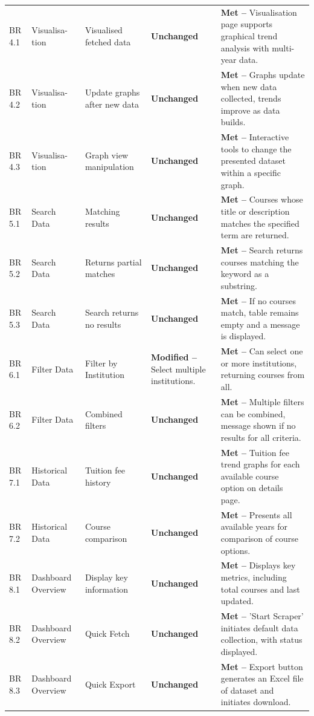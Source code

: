 \begin{xltabular}{\textwidth}{@{} l p{1.5cm} p{2.5cm} p{3.5cm} X @{}}
\midrule

BR 4.1 & Visualisa-tion & Visualised fetched data & \textbf{Unchanged} & \textbf{Met --} Visualisation page supports graphical trend analysis with multi-year data. \\
BR 4.2 & Visualisa-tion & Update graphs after new data & \textbf{Unchanged} & \textbf{Met --} Graphs update when new data collected, trends improve as data builds. \\
BR 4.3 & Visualisa-tion & Graph view manipulation & \textbf{Unchanged} & \textbf{Met --} Interactive tools to change the presented dataset within a specific graph. \\

\midrule

BR 5.1 & Search Data & Matching results & \textbf{Unchanged} & \textbf{Met --} Courses whose title or description matches the specified term are returned. \\
BR 5.2 & Search Data & Returns partial matches & \textbf{Unchanged} & \textbf{Met --} Search returns courses matching the keyword as a substring. \\
BR 5.3 & Search Data & Search returns no results & \textbf{Unchanged} & \textbf{Met --} If no courses match, table remains empty and a message is displayed. \\

\midrule

BR 6.1 & Filter Data & Filter by Institution & \textbf{Modified --} Select multiple institutions. & \textbf{Met --} Can select one or more institutions, returning courses from all. \\
BR 6.2 & Filter Data & Combined filters & \textbf{Unchanged} & \textbf{Met --} Multiple filters can be combined, message shown if no results for all criteria. \\

\midrule

BR 7.1 & Historical Data & Tuition fee history & \textbf{Unchanged} & \textbf{Met --} Tuition fee trend graphs for each available course option on details page. \\

BR 7.2 & Historical Data & Course comparison & \textbf{Unchanged} & \textbf{Met --} Presents all available years for comparison of course options. \\

\midrule

BR 8.1 & Dashboard Overview & Display key information & \textbf{Unchanged} & \textbf{Met --} Displays key metrics, including total courses and last updated. \\
BR 8.2 & Dashboard Overview & Quick Fetch & \textbf{Unchanged} & \textbf{Met --} 'Start Scraper' initiates default data collection, with status displayed. \\
BR 8.3 & Dashboard Overview & Quick Export & \textbf{Unchanged} &\textbf{Met --} Export button generates an Excel file of dataset and initiates download. \\


\end{xltabular}

